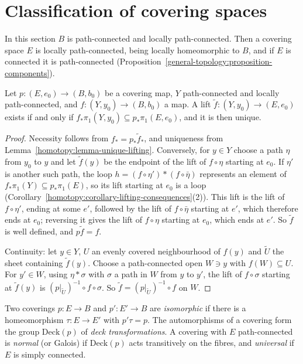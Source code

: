\section{Classification of covering spaces}\label{homotopy:section-classification}

In this section $B$ is path-connected and locally path-connected. Then a covering space $E$ is locally path-connected, being locally homeomorphic to $B$,
and if $E$ is connected it is path-connected (Proposition~\ref{general-topology:proposition-components}).

\begin{proposition}\label{homotopy:proposition-lifting-criterion}
Let $p \colon (E, e_0) \to (B, b_0)$ be a covering map, $Y$ path-connected and locally path-connected, and $f \colon (Y, y_0) \to (B, b_0)$ a map. A lift
$\tilde{f} \colon (Y, y_0) \to (E, e_0)$ exists if and only if $f_*\pi_1(Y, y_0) \subseteq p_*\pi_1(E, e_0)$, and it is then unique.
\end{proposition}

\begin{proof}
Necessity follows from $f_* = p_*\tilde{f}_*$, and uniqueness from Lemma~\ref{homotopy:lemma-unique-lifting}. Conversely, for $y \in Y$ choose a path $\eta$ from
$y_0$ to $y$ and let $\tilde{f}(y)$ be the endpoint of the lift of $f \circ \eta$ starting at $e_0$. If $\eta'$ is another such path, the loop
$h = (f \circ \eta') * (f \circ \bar\eta)$ represents an element of $f_*\pi_1(Y) \subseteq p_*\pi_1(E)$, so its lift starting at $e_0$ is a loop
(Corollary~\ref{homotopy:corollary-lifting-consequences}(2)). This lift is the lift of $f \circ \eta'$, ending at some $e'$, followed by the lift of $f \circ \bar\eta$
starting at $e'$, which therefore ends at $e_0$; reversing it gives the lift of $f \circ \eta$ starting at $e_0$, which ends at $e'$. So $\tilde{f}$ is well defined,
and $p\tilde{f} = f$.

Continuity: let $y \in Y$, $U$ an evenly covered neighbourhood of $f(y)$ and $\tilde U$ the sheet containing $\tilde f(y)$. Choose a path-connected open
$W \ni y$ with $f(W) \subseteq U$. For $y' \in W$, using $\eta * \sigma$ with $\sigma$ a path in $W$ from $y$ to $y'$, the lift of $f \circ \sigma$ starting at
$\tilde{f}(y)$ is $(p|_{\tilde U})^{-1} \circ f \circ \sigma$. So $\tilde{f} = (p|_{\tilde U})^{-1} \circ f$ on $W$.
\end{proof}

\begin{definition}\label{homotopy:definition-deck}
Two coverings $p \colon E \to B$ and $p' \colon E' \to B$ are \emph{isomorphic} if there is a homeomorphism $\tau \colon E \to E'$ with $p'\tau = p$. The
automorphisms of a covering form the group $\mathrm{Deck}(p)$ of \emph{deck transformations}. A covering with $E$ path-connected is \emph{normal} (or
Galois) if $\mathrm{Deck}(p)$ acts transitively on the fibres, and \emph{universal} if $E$ is simply connected.
\end{definition}

